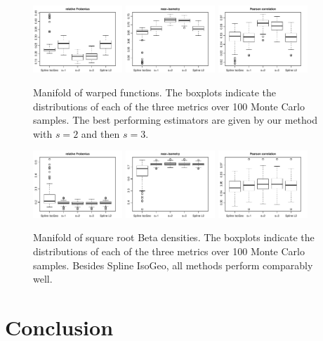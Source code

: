 \begin{figure}
\centering
\includegraphics[width=0.3\textwidth]{./graphics/sce=5_SNR=high_Kobs=30_MSE}
\includegraphics[width=0.3\textwidth]{./graphics/sce=5_SNR=high_Kobs=30_isometry}
\includegraphics[width=0.3\textwidth]{./graphics/sce=5_SNR=high_Kobs=30_Pearson}
\caption{Manifold of warped functions. The boxplots indicate the distributions of each of the three metrics over 100 Monte Carlo samples. The best performing estimators are given by our method with $s=2$ and then $s=3$.}
\label{fig:warping}
\end{figure}

\begin{figure}
\includegraphics[width=0.3\textwidth]{./graphics/sce=4_SNR=high_Kobs=30_MSE}
\includegraphics[width=0.3\textwidth]{./graphics/sce=4_SNR=high_Kobs=30_isometry}
\includegraphics[width=0.3\textwidth]{./graphics/sce=4_SNR=high_Kobs=30_Pearson}
\caption{Manifold of square root Beta densities. The boxplots indicate the distributions of each of the three metrics over 100 Monte Carlo samples. Besides Spline IsoGeo, all methods perform comparably well.}
\label{fig:betas}
\end{figure}

\section{Conclusion}
